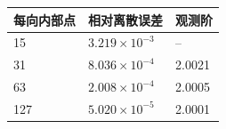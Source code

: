 \begin{tabular}{lll}\toprule
每向内部点 & 相对离散误差 & 观测阶 \\ \midrule
15 & $3.219\times10^{-3}$ & -- \\
31 & $8.036\times10^{-4}$ & 2.0021 \\
63 & $2.008\times10^{-4}$ & 2.0005 \\
127 & $5.020\times10^{-5}$ & 2.0001 \\
\bottomrule\end{tabular}

